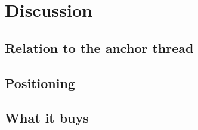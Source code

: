 \section{Discussion}
\label{sec:discussion}

\subsection{Relation to the anchor thread}
\label{sec:discussion-thread}


\subsection{Positioning}
\label{sec:discussion-positioning}


\subsection{What it buys}
\label{sec:discussion-buys}

